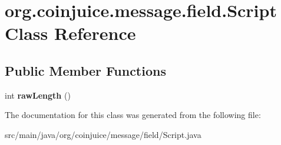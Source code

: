 \hypertarget{classorg_1_1coinjuice_1_1message_1_1field_1_1_script}{\section{org.\-coinjuice.\-message.\-field.\-Script Class Reference}
\label{classorg_1_1coinjuice_1_1message_1_1field_1_1_script}
}
\subsection*{Public Member Functions}
\begin{DoxyCompactItemize}
\item 
\hypertarget{classorg_1_1coinjuice_1_1message_1_1field_1_1_script_aa166ecd1dacb2462cf3ac4b378869ffd}{int {\bfseries raw\-Length} ()}\label{classorg_1_1coinjuice_1_1message_1_1field_1_1_script_aa166ecd1dacb2462cf3ac4b378869ffd}

\end{DoxyCompactItemize}


The documentation for this class was generated from the following file\-:\begin{DoxyCompactItemize}
\item 
src/main/java/org/coinjuice/message/field/Script.\-java\end{DoxyCompactItemize}

